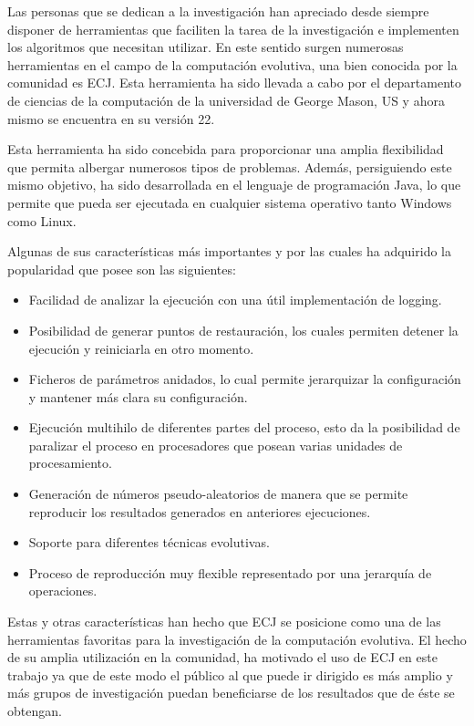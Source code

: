 Las personas que se dedican a la investigación han apreciado desde siempre disponer de herramientas que faciliten la tarea de la investigación e implementen los algoritmos que necesitan utilizar. En este sentido surgen numerosas herramientas en el campo de la computación evolutiva, una bien conocida por la comunidad es ECJ. Esta herramienta ha sido llevada a cabo por el departamento de ciencias de la computación de la universidad de George Mason, US y ahora mismo se encuentra en su versi\'on 22.

Esta herramienta ha sido concebida para proporcionar una amplia flexibilidad que permita albergar numerosos tipos de problemas. Adem\'as, persiguiendo este mismo objetivo, ha sido desarrollada en el lenguaje de programación Java, lo que permite que pueda ser ejecutada en cualquier sistema operativo tanto Windows como Linux.

Algunas de sus características m\'as importantes y por las cuales ha adquirido la popularidad que posee son las siguientes:

\begin{itemize}
	\item Facilidad de analizar la ejecución con una \'util implementación de logging.
	\item Posibilidad de generar puntos de restauración, los cuales permiten detener la ejecución y reiniciarla en otro momento.
	\item Ficheros de parámetros anidados, lo cual permite jerarquizar la configuración y mantener m\'as clara su configuración.
	\item Ejecución multihilo de diferentes partes del proceso, esto da la posibilidad de paralizar el proceso en procesadores que posean varias unidades de procesamiento.
	\item Generación de n\'umeros pseudo-aleatorios de manera que se permite reproducir los resultados generados en anteriores ejecuciones.
	\item Soporte para diferentes técnicas evolutivas.
	\item Proceso de reproducción muy flexible representado por una jerarquía de operaciones.
\end{itemize}

Estas y otras características han hecho que ECJ se posicione como una de las herramientas favoritas para la investigación de la computación evolutiva. El hecho de su amplia utilización en la comunidad, ha motivado el uso de ECJ en este trabajo ya que de este modo el p\'ublico al que puede ir dirigido es m\'as amplio y m\'as grupos de investigación puedan beneficiarse de los resultados que de \'este se obtengan.

